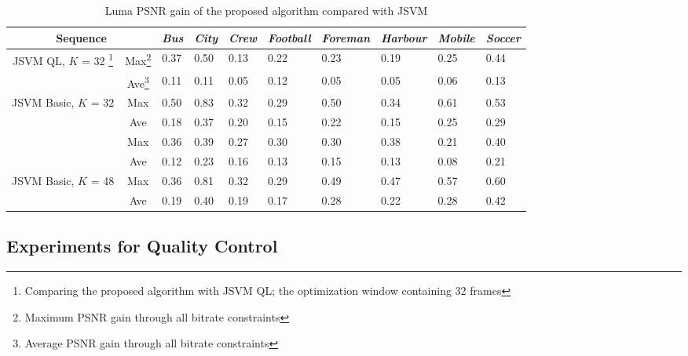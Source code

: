 \documentclass[journal]{IEEEtran}
\begin{document}
\begin{table}[t]
\centering
\caption{Luma PSNR gain of the proposed algorithm compared with JSVM}
\label{tab:extraction-gain}
\begin{minipage}{0.95\linewidth}
\centering
\begin{tabular}{c|c|p{1.2cm}<{\centering}|p{1.2cm}<{\centering}|p{1.2cm}<{\centering}|p{1.2cm}<{\centering}| 
p{1.2cm}<{\centering}|p{1.2cm}<{\centering}|p{1.2cm}<{\centering}|p{1.2cm}<{\centering}}
\hline \hline
\multicolumn{2}{c|}{Sequence} &
{\em Bus} & {\em City} & {\em Crew} & {\em Football} & {\em Foreman} & {\em Harbour} & {\em Mobile} & {\em Soccer} \\ \hline 
\multirow{2}{*}{JSVM QL, $K$ = 32 \footnote{\label{footnote:JSVM_QL} Comparing the proposed algorithm with JSVM QL; the optimization window containing 32 frames}}
& Max\footnote{\label{footnote:max} Maximum PSNR gain through all bitrate constraints}
& 0.37 & 0.50 & 0.13 & 0.22 & 0.23 & 0.19 & 0.25 & 0.44 \\ \cline{2-10}
& Ave\footnote{\label{footnote:ave} Average PSNR gain through all bitrate constraints}
& 0.11 & 0.11 & 0.05 & 0.12 & 0.05 & 0.05 & 0.06 & 0.13 \\ \hline
\multirow{2}{*}{JSVM Basic, $K$ = 32}
& Max & 0.50 & 0.83 & 0.32 & 0.29 & 0.50 & 0.34 & 0.61 & 0.53 \\ \cline{2-10}
& Ave & 0.18 & 0.37 & 0.20 & 0.15 & 0.22 & 0.15 & 0.25 & 0.29 \\ \Xhline{2\arrayrulewidth}
\multirow{2}{*}{JSVM QL, $K$ = 48}
& Max & 0.36 & 0.39 & 0.27 & 0.30 & 0.30 & 0.38 & 0.21 & 0.40 \\ \cline{2-10}
& Ave & 0.12 & 0.23 & 0.16 & 0.13 & 0.15 & 0.13 & 0.08 & 0.21 \\ \hline
\multirow{2}{*}{JSVM Basic, $K$ = 48}
& Max & 0.36 & 0.81 & 0.32 & 0.29 & 0.49 & 0.47 & 0.57 & 0.60 \\ \cline{2-10}
& Ave & 0.19 & 0.40 & 0.19 & 0.17 & 0.28 & 0.22 & 0.28 & 0.42 \\ \hline
\end{tabular}
\end{minipage}
\end{table}

\subsection{Experiments for Quality Control}
\label{subsec:exp-control}
\end{document}
